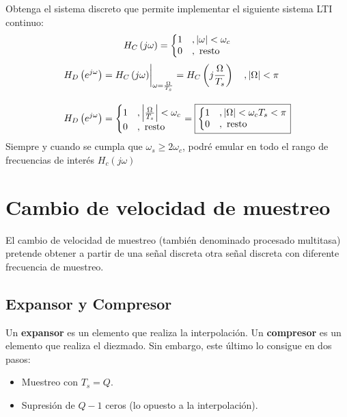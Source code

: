 \documentclass[a4paper,oneside]{book}
\begin{document}
\ejemplo
{
	Obtenga el sistema discreto que permite implementar el siguiente sistema LTI continuo:
	\[ H_C \left( j\omega \right) = \left\lbrace
		\begin{matrix*}[l]
			1	&, \abs{\omega }<\omega _c\\
			0	&, \text{ resto}
		\end{matrix*} \right. \]
}
{
	\begin{align*}
		H_D \left( e^{j\omega} \right) & = \biggl. H_C \left( j\omega \right) \biggr\vert_{\omega = \frac{\Omega}{T_s}} = H_C \left( j \frac{\Omega}{T_s} \right) \quad , \abs{\Omega}<\pi \\[10pt]
		H_D \left( e^{j\omega} \right) & = \left\lbrace
		\begin{matrix*}[l]
			1 & , \abs{\frac{\Omega}{T_s} }<\omega _c\\
			0 & , \text{ resto}
		\end{matrix*} \right. = \boxed{\left\lbrace
		\begin{matrix*}[l]
			1 & , \abs{\Omega}<\omega _cT_s<\pi\\
			0 & , \text{ resto}
		\end{matrix*} \right.}
	\end{align*}
Siempre y cuando se cumpla que $\omega_s\geq 2\omega_c$, podré emular en todo el rango de frecuencias de interés $H_c \left( j\omega \right)$
}

\section{Cambio de velocidad de muestreo}

El cambio de velocidad de muestreo (también denominado procesado multitasa) pretende obtener a partir de una señal discreta otra señal discreta con diferente frecuencia de muestreo.

\subsection{Expansor y Compresor}

Un \textbf{expansor} es un elemento que realiza la interpolación. Un \textbf{compresor} es un elemento que realiza el diezmado. Sin embargo, este último lo consigue en dos pasos:
\begin{itemize}
	\item Muestreo con $T_s = Q$.
	\item Supresión de $Q - 1$ ceros (lo opuesto a la interpolación).
\end{itemize}
\end{document}
